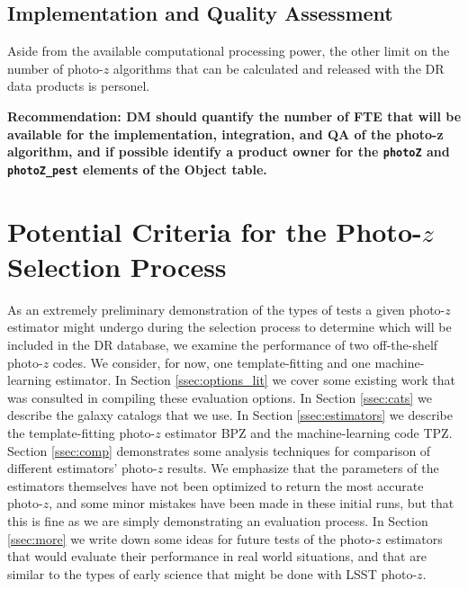 \documentclass[DM,lsstdraft,toc]{lsstdoc}
\begin{document}

\subsection{Implementation and Quality Assessment}\label{ssec:tech_implement}

Aside from the available computational processing power, the other limit on the number of photo-$z$ algorithms that can be calculated and released with the DR data products is personel.

\textbf{Recommendation: DM should quantify the number of FTE that will be available for the implementation, integration, and QA of the photo-z algorithm, and if possible identify a product owner for the {\tt photoZ} and {\tt photoZ\_pest} elements of the Object table.}



\section{Potential Criteria for the Photo-$z$ Selection Process}\label{sec:options}

As an extremely preliminary demonstration of the types of tests a given photo-$z$ estimator might undergo during the selection process to determine which will be included in the DR database, we examine the performance of two off-the-shelf photo-$z$ codes. We consider, for now, one template-fitting and one machine-learning estimator. In Section \ref{ssec:options_lit} we cover some existing work that was consulted in compiling these evaluation options. In Section \ref{ssec:cats} we describe the galaxy catalogs that we use. In Section \ref{ssec:estimators} we describe the template-fitting photo-$z$ estimator BPZ and the machine-learning code TPZ. Section \ref{ssec:comp} demonstrates some analysis techniques for comparison of different estimators' photo-$z$ results. We emphasize that the parameters of the estimators themselves have not been optimized to return the most accurate photo-$z$, and some minor mistakes have been made in these initial runs, but that this is fine as we are simply demonstrating an evaluation process. In Section \ref{ssec:more} we write down some ideas for future tests of the photo-$z$ estimators that would evaluate their performance in real world situations, and that are similar to the types of early science that might be done with LSST photo-$z$.
\end{document}
